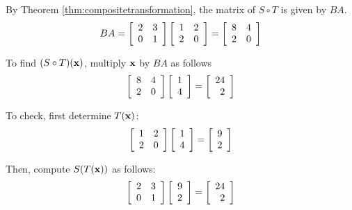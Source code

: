 \begin{solution}
By Theorem \ref{thm:compositetransformation}, the matrix of $S \circ T$ is given by $BA$. 
\[
BA 
=
\left[
\begin{array}{rr}
2 & 3 \\
0 & 1
\end{array}
\right]
\left[
\begin{array}{rr}
1 & 2 \\
2 & 0 
\end{array}
\right]
 =
\left[
\begin{array}{rr}
8 & 4 \\
2 & 0
\end{array}
\right]
\]

To find $(S \circ T)({\bf x})$, multiply ${\bf x}$ by $BA$ as follows
\[
\left[
\begin{array}{rr}
8 & 4 \\
2 & 0
\end{array}
\right]
\left[
\begin{array}{rr}
1 \\
4
\end{array}
\right]
=
\left[
\begin{array}{r}
24 \\
2
\end{array}
\right]
\]

To check, first determine $T({\bf x})$:
\[
\left[
\begin{array}{rr}
1 & 2 \\
2 & 0 
\end{array}
\right]
\left[
\begin{array}{r}
1 \\
4
\end{array}
\right]
=
\left[
\begin{array}{r}
9 \\
2
\end{array}
\right]
\]

Then, compute $S(T({\bf x}))$ as follows:
\[
\left[
\begin{array}{rr}
2 & 3 \\
0 & 1 
\end{array}
\right]
\left[
\begin{array}{r}
9 \\
2
\end{array}
\right]
=
\left[
\begin{array}{r}
24 \\
2
\end{array}
\right]
\]
\end{solution}


